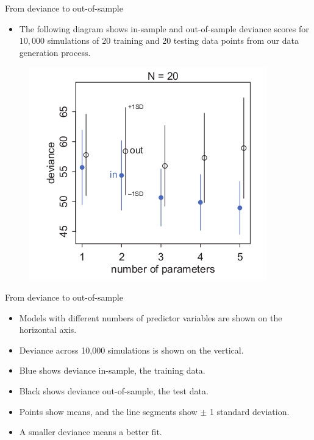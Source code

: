 \documentclass[handout]{beamer}
\begin{document}
\begin{frame}{From deviance to out-of-sample}
\scriptsize{

\begin{itemize}

\item The following diagram shows in-sample and out-of-sample deviance scores for $10,000$ simulations of 20 training and 20 testing data points from our data generation process.
\end{itemize}


\begin{figure}[h!]
	\centering
	\includegraphics[scale=0.5]{pics/dev_ex2.png}
\end{figure}






} 
\end{frame}


\begin{frame}{From deviance to out-of-sample}
\scriptsize{

\begin{itemize}



\item Models with different numbers of predictor variables are shown on the horizontal axis.

\item Deviance across 10,000 simulations is shown on the vertical. 

\item Blue shows deviance in-sample, the training data. 
\item Black shows deviance out-of-sample, the test data. 
\item Points show means, and the line segments show $\pm$ 1 standard
deviation.

\item A smaller deviance means a better fit. 


\end{itemize}


} 
\end{frame}
\end{document}

